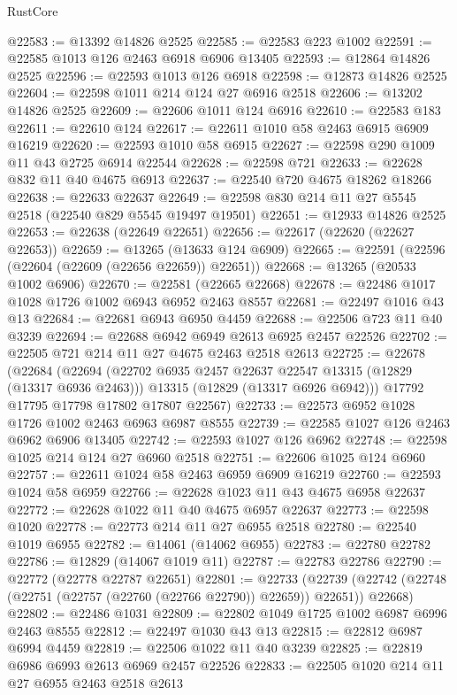 \begin{lexlean}{RustCore}
\begin{coremodule}
@22583 := @13392 @14826 @2525
@22585 := @22583 @223 @1002
@22591 := @22585 @1013 @126 @2463 @6918 @6906 @13405
@22593 := @12864 @14826 @2525
@22596 := @22593 @1013 @126 @6918
@22598 := @12873 @14826 @2525
@22604 := @22598 @1011 @214 @124 @27 @6916 @2518
@22606 := @13202 @14826 @2525
@22609 := @22606 @1011 @124 @6916
@22610 := @22583 @183
@22611 := @22610 @124
@22617 := @22611 @1010 @58 @2463 @6915 @6909 @16219
@22620 := @22593 @1010 @58 @6915
@22627 := @22598 @290 @1009 @11 @43 @2725 @6914 @22544
@22628 := @22598 @721
@22633 := @22628 @832 @11 @40 @4675 @6913
@22637 := @22540 @720 @4675 @18262 @18266
@22638 := @22633 @22637
@22649 := @22598 @830 @214 @11 @27 @5545 @2518 (@22540 @829 @5545 @19497 @19501)
@22651 := @12933 @14826 @2525
@22653 := @22638 (@22649 @22651)
@22656 := @22617 (@22620 (@22627 @22653))
@22659 := @13265 (@13633 @124 @6909)
@22665 := @22591 (@22596 (@22604 (@22609 (@22656 @22659)) @22651))
@22668 := @13265 (@20533 @1002 @6906)
@22670 := @22581 (@22665 @22668)
@22678 := @22486 @1017 @1028 @1726 @1002 @6943 @6952 @2463 @8557
@22681 := @22497 @1016 @43 @13
@22684 := @22681 @6943 @6950 @4459
@22688 := @22506 @723 @11 @40 @3239
@22694 := @22688 @6942 @6949 @2613 @6925 @2457 @22526
@22702 := @22505 @721 @214 @11 @27 @4675 @2463 @2518 @2613
@22725 := @22678
    (@22684
      (@22694
        (@22702 @6935 @2457 @22637 @22547 @13315 (@12829 (@13317 @6936 @2463)))
        @13315
        (@12829 (@13317 @6926 @6942)))
      @17792
      @17795
      @17798
      @17802
      @17807
      @22567)
@22733 := @22573 @6952 @1028 @1726 @1002 @2463 @6963 @6987 @8555
@22739 := @22585 @1027 @126 @2463 @6962 @6906 @13405
@22742 := @22593 @1027 @126 @6962
@22748 := @22598 @1025 @214 @124 @27 @6960 @2518
@22751 := @22606 @1025 @124 @6960
@22757 := @22611 @1024 @58 @2463 @6959 @6909 @16219
@22760 := @22593 @1024 @58 @6959
@22766 := @22628 @1023 @11 @43 @4675 @6958 @22637
@22772 := @22628 @1022 @11 @40 @4675 @6957 @22637
@22773 := @22598 @1020
@22778 := @22773 @214 @11 @27 @6955 @2518
@22780 := @22540 @1019 @6955
@22782 := @14061 (@14062 @6955)
@22783 := @22780 @22782
@22786 := @12829 (@14067 @1019 @11)
@22787 := @22783 @22786
@22790 := @22772 (@22778 @22787 @22651)
@22801 := @22733
    (@22739 (@22742 (@22748 (@22751 (@22757 (@22760 (@22766 @22790)) @22659)) @22651)) @22668)
@22802 := @22486 @1031
@22809 := @22802 @1049 @1725 @1002 @6987 @6996 @2463 @8555
@22812 := @22497 @1030 @43 @13
@22815 := @22812 @6987 @6994 @4459
@22819 := @22506 @1022 @11 @40 @3239
@22825 := @22819 @6986 @6993 @2613 @6969 @2457 @22526
@22833 := @22505 @1020 @214 @11 @27 @6955 @2463 @2518 @2613

\end{coremodule}
\end{lexlean}
